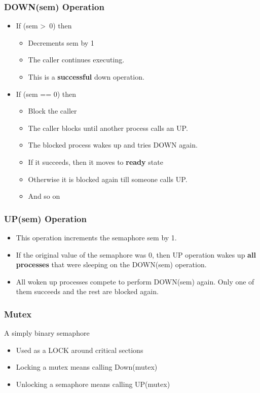 \documentclass[12pt]{article}
\begin{document}
\subsubsection{DOWN(sem) Operation}
\begin{itemize}
    \item If (sem \textgreater \ 0) then \begin{itemize}
        \item Decrements sem by 1 
        \item The caller continues executing. 
        \item This is a {\bfseries successful} down operation.
    \end{itemize}
    \item If (sem == 0) then \begin{itemize}
        \item Block the caller 
        \item The caller blocks until another process calls an UP. 
        \item The blocked process wakes up and tries DOWN again. 
        \item If it succeeds, then it moves to {\bfseries ready} state 
        \item Otherwise it is blocked again till someone calls UP. 
        \item And so on
    \end{itemize}
\end{itemize}
\subsubsection{UP(sem) Operation}
\begin{itemize}
    \item This operation increments the semaphore sem by 1. 
    \item If the original value of the semaphore was 0, then UP operation wakes up {\bfseries all processes} that were sleeping on the DOWN(sem) operation. 
    \item All woken up processes compete to perform DOWN(sem) again. Only one of them succeeds and the rest are blocked again.
\end{itemize}
\subsubsection{Mutex}
A simply binary semaphore
\begin{itemize}
    \item Used as a LOCK around critical sections
    \item Locking a mutex means calling Down(mutex)
    \item Unlocking a semaphore means calling UP(mutex)
\end{itemize}
\end{document}
